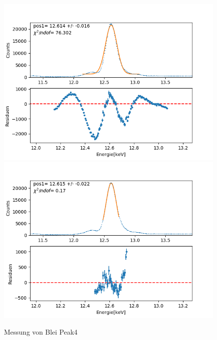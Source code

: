 \documentclass[12pt,a4paper]{article}
\begin{document}
\begin{figure}[H]
\centering
\includegraphics[scale=0.49]{Bilder/roentgen_spektren/blei/pb4_1.png}
\includegraphics[scale=0.49]{Bilder/roentgen_spektren/blei/pb4_2.png}
\caption{Messung von Blei Peak4}
\end{figure}
\end{document}
